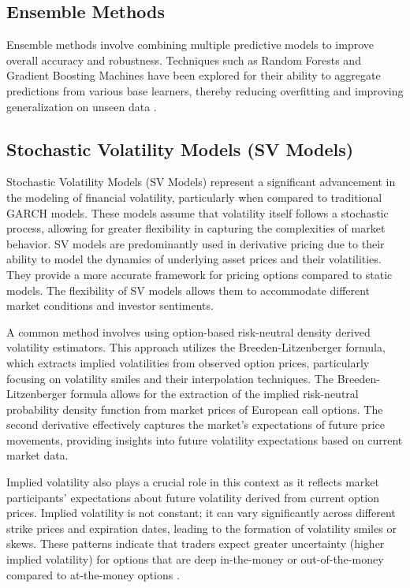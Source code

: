 \documentclass[8pt]{article}
\begin{document}
\begin{multicols}{2}
		\subsection{Ensemble Methods}
		Ensemble methods involve combining multiple predictive models to improve overall accuracy and robustness. Techniques such as Random Forests and Gradient Boosting Machines have been explored for their ability to aggregate predictions from various base learners, thereby reducing overfitting and improving generalization on unseen data \cite{bara2024}.
		
		\subsection{Stochastic Volatility Models (SV Models)}
		Stochastic Volatility Models (SV Models) represent a significant advancement in the modeling of financial volatility, particularly when compared to traditional GARCH models. These models assume that volatility itself follows a stochastic process, allowing for greater flexibility in capturing the complexities of market behavior. SV models are predominantly used in derivative pricing due to their ability to model the dynamics of underlying asset prices and their volatilities. They provide a more accurate framework for pricing options compared to static models. The flexibility of SV models allows them to accommodate different market conditions and investor sentiments.
		
		A common method involves using option-based risk-neutral density derived volatility estimators. This approach utilizes the Breeden-Litzenberger formula, which extracts implied volatilities from observed option prices, particularly focusing on volatility smiles and their interpolation techniques. The Breeden-Litzenberger formula \cite{breeden1978} allows for the extraction of the implied risk-neutral probability density function from market prices of European call options. The second derivative effectively captures the market's expectations of future price movements, providing insights into future volatility expectations based on current market data.
		
		Implied volatility also plays a crucial role in this context as it reflects market participants' expectations about future volatility derived from current option prices. Implied volatility is not constant; it can vary significantly across different strike prices and expiration dates, leading to the formation of volatility smiles or skews. These patterns indicate that traders expect greater uncertainty (higher implied volatility) for options that are deep in-the-money or out-of-the-money compared to at-the-money options \cite{gatheral2006}.
		

\end{multicols}
\end{document}
